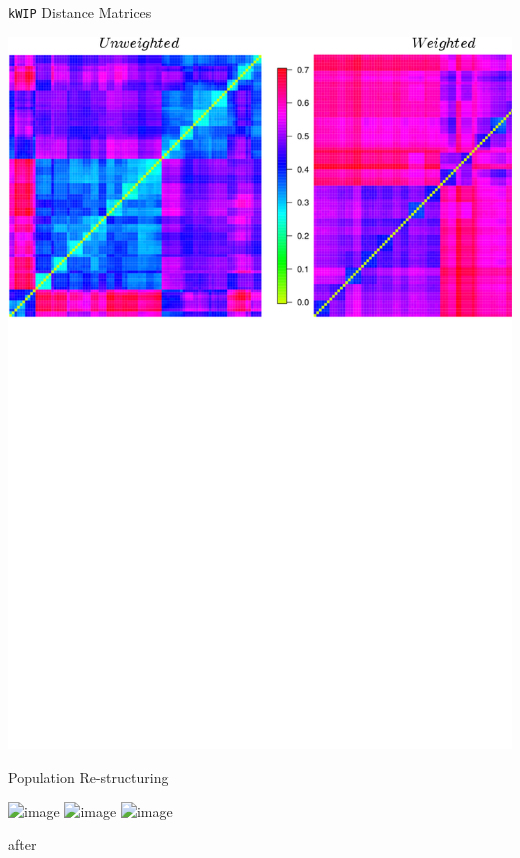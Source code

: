 \documentclass[t]{beamer}
\begin{document}
\begin{frame}{\texttt{kWIP} Distance Matrices}
  \begin{center}
    \includegraphics[width=\textwidth]{img/weight-unweight.png}
  \end{center}
\end{frame}

\begin{frame}{Population Re-structuring}
  \begin{center}
    \includegraphics<1>[width=\textwidth]{img/restruct-1}
    \includegraphics<2>[width=\textwidth]{img/restruct-2}
    \includegraphics<3>[width=\textwidth]{img/restruct-3}
  \end{center}

  \tiny{after \textcite{brachi_genome-wide_2011}}
\end{frame}
\end{document}
